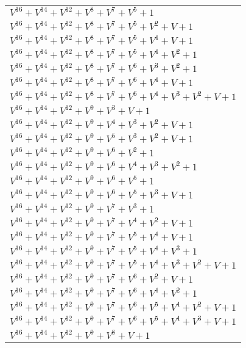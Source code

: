 \documentclass[12pt]{article}
\begin{document}
\begin{adjustwidth}{-4cm}{}
\begin{center}
\begin{longtable}{|l|}
$V^{16}  +V^{14}  +V^{12}  +V^{8}  +V^{7}  +V^{5}  + 1$ \\
$V^{16}  +V^{14}  +V^{12}  +V^{8}  +V^{7}  +V^{5}  +V^{2}  + V + 1$ \\
$V^{16}  +V^{14}  +V^{12}  +V^{8}  +V^{7}  +V^{5}  +V^{4}  + V + 1$ \\
$V^{16}  +V^{14}  +V^{12}  +V^{8}  +V^{7}  +V^{5}  +V^{4}  +V^{2}  + 1$ \\
$V^{16}  +V^{14}  +V^{12}  +V^{8}  +V^{7}  +V^{6}  +V^{3}  +V^{2}  + 1$ \\
$V^{16}  +V^{14}  +V^{12}  +V^{8}  +V^{7}  +V^{6}  +V^{4}  + V + 1$ \\
$V^{16}  +V^{14}  +V^{12}  +V^{8}  +V^{7}  +V^{6}  +V^{4}  +V^{3}  +V^{2}  + V + 1$ \\
$V^{16}  +V^{14}  +V^{12}  +V^{9}  +V^{3}  + V + 1$ \\
$V^{16}  +V^{14}  +V^{12}  +V^{9}  +V^{4}  +V^{3}  +V^{2}  + V + 1$ \\
$V^{16}  +V^{14}  +V^{12}  +V^{9}  +V^{5}  +V^{3}  +V^{2}  + V + 1$ \\
$V^{16}  +V^{14}  +V^{12}  +V^{9}  +V^{6}  +V^{2}  + 1$ \\
$V^{16}  +V^{14}  +V^{12}  +V^{9}  +V^{6}  +V^{4}  +V^{3}  +V^{2}  + 1$ \\
$V^{16}  +V^{14}  +V^{12}  +V^{9}  +V^{6}  +V^{5}  + 1$ \\
$V^{16}  +V^{14}  +V^{12}  +V^{9}  +V^{6}  +V^{5}  +V^{3}  + V + 1$ \\
$V^{16}  +V^{14}  +V^{12}  +V^{9}  +V^{7}  +V^{3}  + 1$ \\
$V^{16}  +V^{14}  +V^{12}  +V^{9}  +V^{7}  +V^{4}  +V^{2}  + V + 1$ \\
$V^{16}  +V^{14}  +V^{12}  +V^{9}  +V^{7}  +V^{5}  +V^{4}  + V + 1$ \\
$V^{16}  +V^{14}  +V^{12}  +V^{9}  +V^{7}  +V^{5}  +V^{4}  +V^{3}  + 1$ \\
$V^{16}  +V^{14}  +V^{12}  +V^{9}  +V^{7}  +V^{5}  +V^{4}  +V^{3}  +V^{2}  + V + 1$ \\
$V^{16}  +V^{14}  +V^{12}  +V^{9}  +V^{7}  +V^{6}  +V^{2}  + V + 1$ \\
$V^{16}  +V^{14}  +V^{12}  +V^{9}  +V^{7}  +V^{6}  +V^{4}  +V^{2}  + 1$ \\
$V^{16}  +V^{14}  +V^{12}  +V^{9}  +V^{7}  +V^{6}  +V^{5}  +V^{4}  +V^{2}  + V + 1$ \\
$V^{16}  +V^{14}  +V^{12}  +V^{9}  +V^{7}  +V^{6}  +V^{5}  +V^{4}  +V^{3}  + V + 1$ \\
$V^{16}  +V^{14}  +V^{12}  +V^{9}  +V^{8}  + V + 1$ \\

\end{longtable}
\end{center}
\end{adjustwidth}
\end{document}
